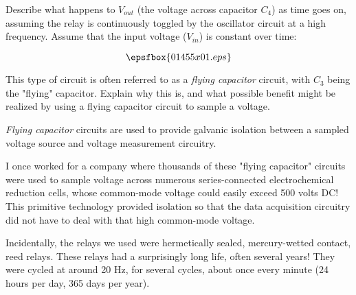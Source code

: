

Describe what happens to $V_{out}$ (the voltage across capacitor $C_4$) as time goes on, assuming the relay is continuously toggled by the oscillator circuit at a high frequency.  Assume that the input voltage ($V_{in}$) is constant over time:

$$\epsfbox{01455x01.eps}$$

This type of circuit is often referred to as a {\it flying capacitor} circuit, with $C_3$ being the "flying" capacitor.  Explain why this is, and what possible benefit might be realized by using a flying capacitor circuit to sample a voltage.







{\it Flying capacitor} circuits are used to provide galvanic isolation between a sampled voltage source and voltage measurement circuitry.







I once worked for a company where thousands of these "flying capacitor" circuits were used to sample voltage across numerous series-connected electrochemical reduction cells, whose common-mode voltage could easily exceed 500 volts DC!  This primitive technology provided isolation so that the data acquisition circuitry did not have to deal with that high common-mode voltage.

Incidentally, the relays we used were hermetically sealed, mercury-wetted contact, reed relays.  These relays had a surprisingly long life, often several years!  They were cycled at around 20 Hz, for several cycles, about once every minute (24 hours per day, 365 days per year).





